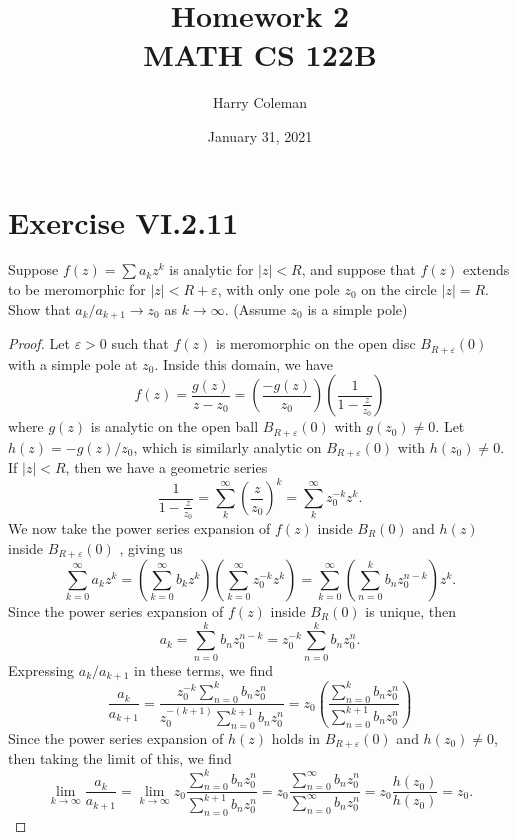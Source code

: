 \documentclass[12pt]{article}
\title{Homework 2\\
    \large MATH CS 122B
}
\author{Harry Coleman}
\date{January 31, 2021}
\newenvironment{pbox}
    {\begin{lrbox}{\mybox}\begin{minipage}{0.98\textwidth}}
    {\end{minipage}\end{lrbox}\begin{center}\framebox[\textwidth]{\usebox{\mybox}}\end{center}}
\theoremstyle{definition}
\newcommand{\eps}{\varepsilon}
\newcommand{\pfrac}[2]{\left(\frac{#1}{#2}\right)}
\begin{document}
\maketitle

\section{Exercise VI.2.11}
\begin{pbox}
    Suppose $f(z) = \sum a_k z^k$ is analytic for $|z| < R$, and suppose that $f(z)$ extends to be meromorphic for $|z| < R + \eps$, with only one pole $z_0$ on the circle $|z| = R$. Show that $a_k/a_{k+1} \to z_0$ as $k \to \infty$. (Assume $z_0$ is a simple pole)
\end{pbox}

\begin{proof}
    Let $\eps >0$ such that $f(z)$ is meromorphic on the open disc $B_{R + \eps}(0)$ with a simple pole at $z_0$. Inside this domain, we have
    \[
        f(z) = \frac{g(z)}{z - z_0} = \pfrac{-g(z)}{z_0} \pfrac{1}{1 - \frac{z}{z_0}}
    \]
    where $g(z)$ is analytic on the open ball $B_{R + \eps}(0)$ with $g(z_0) \ne 0$. Let $h(z) = -g(z)/z_0$, which is similarly analytic on $B_{R + \eps}(0)$ with $h(z_0) \ne 0$. If $|z| < R$, then we have a geometric series
    \[
        \frac{1}{1 - \frac{z}{z_0}} = \sum_{k}^\infty \pfrac{z}{z_0}^k = \sum_{k}^\infty z_0^{-k} z^k.
    \]
    We now take the power series expansion of $f(z)$ inside $B_R(0)$ and $h(z)$ inside $B_{R + \eps}(0)$ , giving us
    \[
        \sum_{k=0}^\infty a_k z^k 
            = \left( \sum_{k=0}^\infty b_k z^k \right) \left( \sum_{k=0}^\infty z_0^{-k} z^k \right)
            = \sum_{k=0}^\infty  \left( \sum_{n=0}^k b_n z_0^{n-k}  \right) z^k.
    \]
    Since the power series expansion of $f(z)$ inside $B_R(0)$ is unique, then
    \[
        a_k = \sum_{n=0}^k b_n z_0^{n-k} = z_0^{-k} \sum_{n=0}^k b_n z_0^n.
    \]
    Expressing $a_k/a_{k+1}$ in these terms, we find
    \[
        \frac{a_k}{a_{k+1}} 
            = \frac{z_0^{-k} \sum_{n=0}^k b_n z_0^n}{z_0^{-(k+1)} \sum_{n=0}^{k+1} b_n z_0^n}
            = z_0 \pfrac{\sum_{n=0}^k b_n z_0^n}{\sum_{n=0}^{k+1} b_n z_0^n}
    \]
    Since the power series expansion of $h(z)$ holds in $B_{R + \eps}(0)$ and $h(z_0) \ne 0$, then taking the limit of this, we find
    \[
        \lim_{k \to \infty} \frac{a_k}{a_{k + 1}} 
            = \lim_{k \to \infty} z_0 \frac{\sum_{n=0}^k b_n z_0^n}{\sum_{n=0}^{k+1} b_n z_0^n}
            = z_0 \frac{\sum_{n=0}^{\infty} b_n z_0^n}{\sum_{n=0}^{\infty} b_n z_0^n}
            = z_0 \frac{h(z_0)}{h(z_0)}
            = z_0.
    \]
    
\end{proof}
\end{document}

